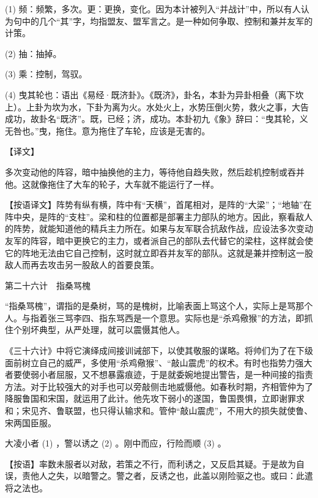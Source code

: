 \documentclass[12pt,UTF8]{ctexbook}
\begin{document}
(1) 频：频繁，多次。更：更换，变化。因为本计被列入“并战计”中，所以有人认为句中的几个“其”字，均指盟友、盟军言之。是一种如何争取、控制和兼并友军的计策。

(2) 抽：抽掉。

(3) 乘：控制，驾驭。

(4) 曳其轮也：语出《易经·既济卦》。《既济》，卦名，本卦为异卦相叠（离下坎上）。上卦为坎为水，下卦为离为火。水处火上，水势压倒火势，救火之事，大告成功，故卦名“既济”。既，已经；济，成功。本卦初九《象》辞曰：“曳其轮，义无咎也。”曳，拖住。意为拖住了车轮，应该是无害的。





【译文】


多次变动他的阵容，暗中抽换他的主力，等待他自趋失败，然后趁机控制或吞并他。这就像拖住了大车的轮子，大车就不能运行了一样。

【按语译文】阵势有纵有横，阵中有“天横”，首尾相对，是阵的“大梁”；“地轴”在阵中央，是阵的“支柱”。梁和柱的位置都是部署主力部队的地方。因此，察看敌人的阵势，就能知道他的精兵主力所在。如果与友军联合抗敌作战，应设法多次变动友军的阵容，暗中更换它的主力，或者派自己的部队去代替它的梁柱，这样就会使它的阵地无法由它自己控制，这时就立即吞并友军的部队。这就是兼并控制这一股敌人而再去攻击另一股敌人的首要良策。





第二十六计　指桑骂槐


“指桑骂槐”，谓指的是桑树，骂的是槐树，比喻表面上骂这个人，实际上是骂那个人。与指着张三骂李四、指东骂西是一个意思。实际也是“杀鸡儆猴”的方法，即抓住个别坏典型，从严处理，就可以震慑其他人。

《三十六计》中将它演绎成间接训诫部下，以使其敬服的谋略。将帅们为了在下级面前树立自己的威严，多使用“杀鸡儆猴”、“敲山震虎”的权术。有时也指势力强大者要使弱小者屈服，又不想暴露痕迹，于是就委婉地提出警告，是一种间接的指责方法。对于比较强大的对手也可以旁敲侧击地威慑他。如春秋时期，齐相管仲为了降服鲁国和宋国，就运用了此计。他先攻下弱小的遂国，鲁国畏惧，立即谢罪求和；宋见齐、鲁联盟，也只得认输求和。管仲“敲山震虎”，不用大的损失就使鲁、宋两国臣服。





大凌小者 (1) ，警以诱之 (2) 。刚中而应，行险而顺 (3) 。

【按语】率数未服者以对敌，若策之不行，而利诱之，又反启其疑。于是故为自误，责他人之失，以暗警之。警之者，反诱之也，此盖以刚险驱之也。或曰：此遣将之法也。
\end{document}
